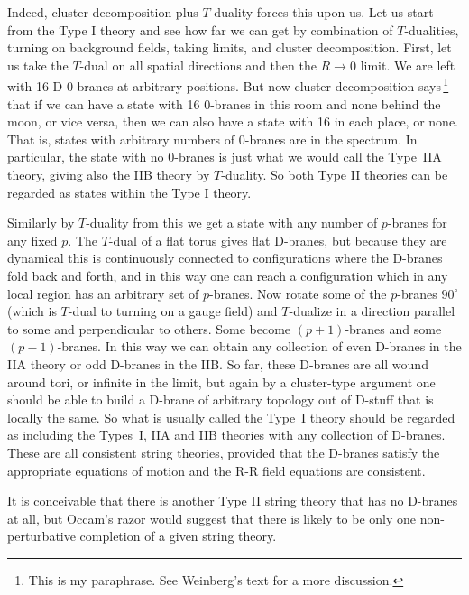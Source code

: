 \documentclass[12pt]{article}
\begin{document}
Indeed, cluster
decomposition plus $T$-duality forces this upon us.  Let us start from the
Type I theory and see how far we can get by combination of $T$-dualities,
turning on background fields, taking limits, and cluster decomposition.
First, let us take the $T$-dual on all spatial directions and then the
$R\to 0$ limit.  We are left with 16 D 0-branes at arbitrary positions. 
But now cluster decomposition says\,\footnote
{This is my paraphrase.  See Weinberg's text \cite{weinberg} for a more
discussion.} that if we can have a state with 16 0-branes in this room and
none behind the moon, or vice versa, then we can also have a state with 16
in each place, or none.  That is, states with arbitrary numbers of 0-branes
are in the spectrum.  In particular, the state with no 0-branes is just
what we would call the Type~IIA theory, giving also the IIB theory by
$T$-duality.  So both Type II theories can be regarded as states within the
Type I theory.

Similarly by $T$-duality from this we get a state with any number of
$p$-branes for any fixed $p$.  The $T$-dual of a
flat torus gives flat D-branes, but because they are dynamical this is
continuously connected to configurations where the D-branes fold back and
forth, and in this way one can reach a configuration which in any local
region has an arbitrary set of $p$-branes.  Now rotate some of the
$p$-branes
$90^\circ$ (which is $T$-dual to turning on a gauge field) and 
$T$-dualize in a direction parallel to some and perpendicular to others. 
Some become $(p+1)$-branes and some $(p-1)$-branes.  In this way we can
obtain any collection of even D-branes in the IIA theory or odd D-branes
in the IIB.  So far, these D-branes are all wound around tori, or infinite
in the limit, but again by a cluster-type argument one should be able to
build a D-brane of arbitrary topology out of D-stuff that is locally the
same.  So what is usually called the Type~I theory should be regarded as
including the Types~I, IIA and IIB theories with any collection of D-branes.
These are all consistent string theories, provided that the D-branes
satisfy the appropriate equations of motion and the R-R field equations
are consistent. 

It is conceivable that there is another Type II string theory that has no
D-branes at all, but Occam's razor would suggest that there is likely to be
only one non-perturbative completion of a given string theory.
\end{document}

